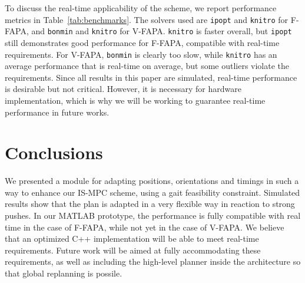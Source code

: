 To discuss the real-time applicability of the scheme, we report performance metrics in Table~\ref{tab:benchmarks}. The solvers used are \texttt{ipopt} and \texttt{knitro} for F-FAPA, and \texttt{bonmin} and \texttt{knitro} for V-FAPA. \texttt{knitro} is faster overall, but \texttt{ipopt} still demonstrates good performance for F-FAPA, compatible with real-time requirements. For V-FAPA, \texttt{bonmin} is clearly too slow, while \texttt{knitro} has an average performance that is real-time on average, but some outliers violate the requirements. Since all results in this paper are simulated, real-time performance is desirable but not critical. However, it is necessary for hardware implementation, which is why we will be working to guarantee real-time performance in future works.


\section{Conclusions}
\label{sec:FAPA:Conclusions}

We presented a module for adapting positions, orientations and timings in such a way to enhance our IS-MPC scheme, using a gait feasibility constraint. Simulated results show that the plan is adapted in a very flexible way in reaction to strong pushes. In our MATLAB prototype, the performance is fully compatible with real time in the case of F-FAPA, while not yet in the case of V-FAPA. We believe that an optimized C++ implementation will be able to meet real-time requirements. Future work will be aimed at fully accommodating these requirements, as well as including the high-level planner \cite{Cipriano2023RAS} inside the architecture so that global replanning is possile.
